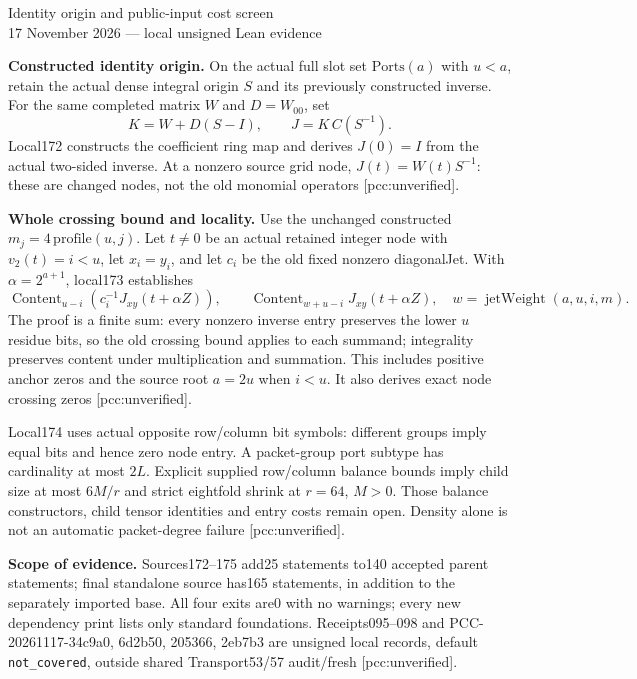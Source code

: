 \documentclass[10pt]{article}
\begin{document}
\begin{center}{\Large Identity origin and public-input cost screen}\\[4pt]
17 November 2026 --- local unsigned Lean evidence\end{center}
\textbf{Constructed identity origin.} On the actual full slot set
$\mathrm{Ports}(a)$ with $u<a$, retain the actual dense integral origin $S$
and its previously constructed inverse. For the same completed matrix $W$
and $D=W_{00}$, set
\[
 K=W+D(S-I),\qquad J=K\,C(S^{-1}).
\]
Local172 constructs the coefficient ring map and derives
$J(0)=I$ from the actual two-sided inverse. At a nonzero source grid node,
$J(t)=W(t)S^{-1}$: these are changed nodes, not the old monomial operators
[pcc:unverified].

\textbf{Whole crossing bound and locality.} Use the unchanged constructed
$m_j=4\,\mathrm{profile}(u,j)$. Let $t\ne0$ be an actual retained integer
node with $v_2(t)=i<u$, let $x_i=y_i$, and let $c_i$ be the old fixed
nonzero diagonalJet. With $\alpha=2^{a+1}$, local173 establishes
\[
 \operatorname{Content}_{u-i}\!\left(c_i^{-1}J_{xy}(t+\alpha Z)\right),
 \qquad
 \operatorname{Content}_{w+u-i}J_{xy}(t+\alpha Z),
 \quad w=\operatorname{jetWeight}(a,u,i,m).
\]
The proof is a finite sum: every nonzero inverse entry preserves the lower
$u$ residue bits, so the old crossing bound applies to each summand;
integrality preserves content under multiplication and summation.
This includes positive anchor zeros and the source root $a=2u$ when $i<u$.
It also derives exact node crossing zeros [pcc:unverified].

Local174 uses actual opposite row/column bit symbols: different groups imply
equal bits and hence zero node entry. A packet-group port subtype has
cardinality at most $2L$. Explicit supplied row/column balance bounds imply
child size at most $6M/r$ and strict eightfold shrink at $r=64$, $M>0$.
Those balance constructors, child tensor identities and entry costs remain
open. Density alone is not an automatic packet-degree failure
[pcc:unverified].

\textbf{Scope of evidence.} Sources172--175 add25 statements to140 accepted
parent statements; final standalone source has165 statements, in addition
to the separately imported base. All four exits are0 with no warnings; every
new dependency print lists only standard foundations. Receipts095--098 and
PCC-20261117-34c9a0, 6d2b50, 205366, 2eb7b3 are unsigned local records,
default \texttt{not\_covered}, outside shared Transport53/57 audit/fresh
[pcc:unverified].
\end{document}
